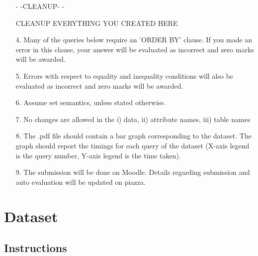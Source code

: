\documentclass[10pt]{article}
\begin{document}
\begin{itemize}
- -CLEANUP- -

CLEANUP EVERYTHING YOU CREATED HERE

\item[4.] Many of the queries below require an 'ORDER BY' clause. If you made an error in this clause, your answer will be evaluated as incorrect and zero marks will be awarded. 

\item[5.] Errors with respect to equality and inequality conditions will also be evaluated as incorrect and zero marks will be awarded. 

\item[6.] Assume set semantics, unless stated otherwise.

\item[7.] No changes are allowed in the i) data, ii) attribute names, iii) table names

\item[8.] The .pdf file should contain a bar graph corresponding to the dataset. The graph should report the timings for each query of the dataset (X-axis legend is the query number, Y-axis legend is the time taken).

\item[9.] The submission will be done on Moodle. Details regarding submission and auto evaluation will be updated on piazza.
\end{itemize}
\section{Dataset}

\subsection{Instructions}
\end{document}
